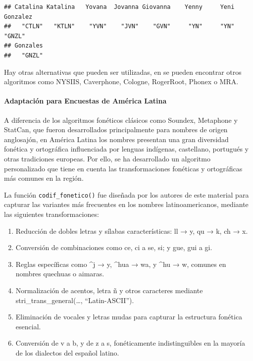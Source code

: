 \documentclass[
  12pt,
]{book}
\providecommand{\tightlist}{%
  \setlength{\itemsep}{0pt}\setlength{\parskip}{0pt}}
\begin{document}
\begin{verbatim}
## Catalina Katalina   Yovana  Jovanna Giovanna    Yenny     Yeni Gonzalez 
##   "CTLN"   "KTLN"    "YVN"    "JVN"    "GVN"     "YN"     "YN"   "GNZL" 
## Gonzales 
##   "GNZL"
\end{verbatim}

Hay otras alternativas que pueden ser utilizadas, en \citet{howard2020phonetic} se pueden encontrar otros algoritmos como NYSIIS, Caverphone, Cologne, RogerRoot, Phonex o MRA.

\paragraph{Adaptación para Encuestas de América Latina}\label{adaptaciuxf3n-para-encuestas-de-amuxe9rica-latina}

A diferencia de los algoritmos fonéticos clásicos como Soundex, Metaphone y StatCan, que fueron desarrollados principalmente para nombres de origen anglosajón, en América Latina los nombres presentan una gran diversidad fonética y ortográfica influenciada por lenguas indígenas, castellano, portugués y otras tradiciones europeas. Por ello, se ha desarrollado un algoritmo personalizado que tiene en cuenta las transformaciones fonéticas y ortográficas más comunes en la región.

La función \texttt{codif\_fonetico()} fue diseñada por los autores de este material para capturar las variantes más frecuentes en los nombres latinoamericanos, mediante las siguientes transformaciones:

\begin{enumerate}
\def\labelenumi{\arabic{enumi}.}
\tightlist
\item
  Reducción de dobles letras y sílabas características: ll → y, qu → k, ch → x.
\item
  Conversión de combinaciones como ce, ci a se, si; y gue, gui a gi.
\item
  Reglas específicas como \^{}j → y, \^{}hua → wa, y \^{}hu → w, comunes en nombres quechuas o aimaras.
\item
  Normalización de acentos, letra ñ y otros caracteres mediante stri\_trans\_general(\ldots, ``Latin-ASCII'').
\item
  Eliminación de vocales y letras mudas para capturar la estructura fonética esencial.
\item
  Conversión de v a b, y de z a s, fonéticamente indistinguibles en la mayoría de los dialectos del español latino.
\end{enumerate}
\end{document}
